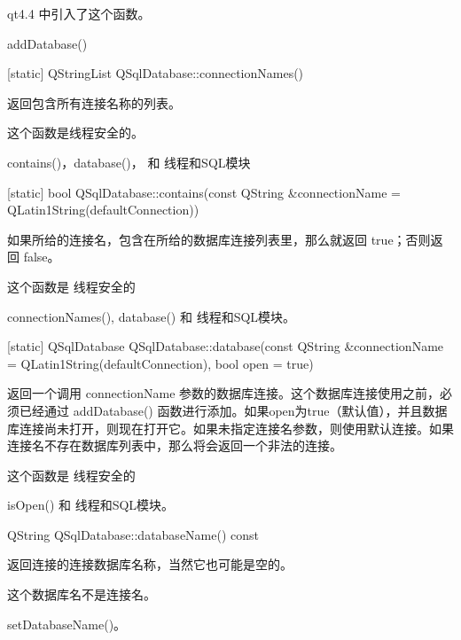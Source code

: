 qt4.4 中引入了这个函数。

\begin{seeAlso}
addDatabase()
\end{seeAlso}


[static] QStringList QSqlDatabase::connectionNames()

返回包含所有连接名称的列表。

\begin{notice}
这个函数是线程安全的。
\end{notice} 

\begin{seeAlso}
contains()，database()， 和 线程和SQL模块
\end{seeAlso}

[static] bool QSqlDatabase::contains(const QString \&connectionName = QLatin1String(defaultConnection))


如果所给的连接名，包含在所给的数据库连接列表里，那么就返回 true；否则返回 false。

\begin{notice}
这个函数是 线程安全的
\end{notice} 


\begin{seeAlso}
connectionNames(), database() 和 线程和SQL模块。
\end{seeAlso}


[static] QSqlDatabase QSqlDatabase::database(const QString \&connectionName = QLatin1String(defaultConnection), bool open = true)


返回一个调用 connectionName 参数的数据库连接。这个数据库连接使用之前，必须已经通过 addDatabase() 函数进行添加。如果open为true（默认值），并且数据库连接尚未打开，则现在打开它。如果未指定连接名参数，则使用默认连接。如果连接名不存在数据库列表中，那么将会返回一个非法的连接。

\begin{notice}
这个函数是 线程安全的
\end{notice}

\begin{seeAlso}
 isOpen() 和 线程和SQL模块。
\end{seeAlso}

QString QSqlDatabase::databaseName() const


返回连接的连接数据库名称，当然它也可能是空的。

\begin{notice}
这个数据库名不是连接名。
\end{notice}

\begin{seeAlso}
setDatabaseName()。
\end{seeAlso}

